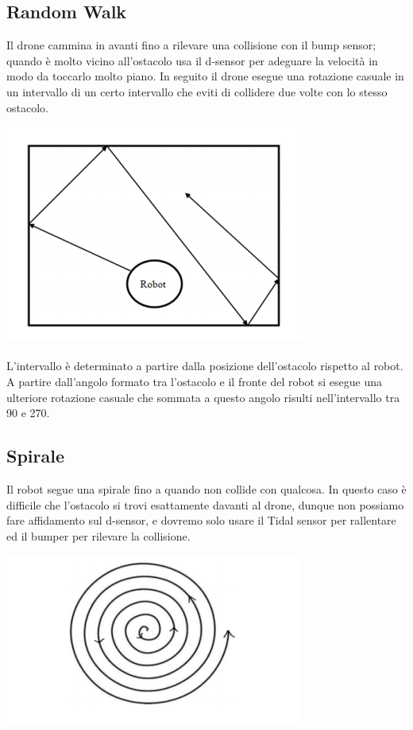 \documentclass{article}
\begin{document}
\subsection{Random Walk}
Il drone cammina in avanti fino a rilevare una collisione con il bump sensor; quando è molto vicino all'ostacolo usa il d-sensor per adeguare la velocità in modo da toccarlo molto piano. In seguito il drone esegue una rotazione casuale in un intervallo di un certo intervallo che eviti di collidere due volte con lo stesso ostacolo.
\begin{center}
\includegraphics[scale=0.5]{media/random walk.png}
    
\end{center}
\paragraph{}
L'intervallo è determinato a partire dalla posizione dell'ostacolo rispetto al robot. A partire dall'angolo formato tra l'ostacolo e il fronte del robot si esegue una ulteriore rotazione casuale che sommata  a questo angolo risulti nell'intervallo tra 90 e 270.
\subsection{Spirale}
Il robot segue una spirale fino a quando non collide con qualcosa. In questo caso è difficile che l'ostacolo si trovi esattamente davanti al drone, dunque non possiamo fare affidamento sul d-sensor, e dovremo solo usare il Tidal sensor per rallentare ed il bumper per rilevare la collisione.
\begin{center}
\includegraphics[scale=0.5]{media/spirale.png}
    
\end{center}
\end{document}
